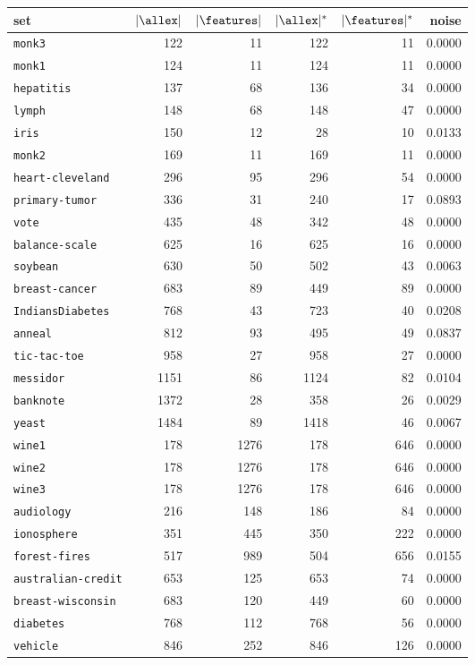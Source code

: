 \begin{tabular}{lrrrrr}
\toprule
set & $|\allex|$ & $|\features|$ & $|\allex|^*$ & $|\features|^*$ & noise \\
\midrule
\texttt{monk3}& 122& 11& 122& 11& 0.0000\\
\texttt{monk1}& 124& 11& 124& 11& 0.0000\\
\texttt{hepatitis}& 137& 68& 136& 34& 0.0000\\
\texttt{lymph}& 148& 68& 148& 47& 0.0000\\
\texttt{iris}& 150& 12& 28& 10& 0.0133\\
\texttt{monk2}& 169& 11& 169& 11& 0.0000\\
\texttt{heart-cleveland}& 296& 95& 296& 54& 0.0000\\
\texttt{primary-tumor}& 336& 31& 240& 17& 0.0893\\
\texttt{vote}& 435& 48& 342& 48& 0.0000\\
\texttt{balance-scale}& 625& 16& 625& 16& 0.0000\\
\texttt{soybean}& 630& 50& 502& 43& 0.0063\\
\texttt{breast-cancer}& 683& 89& 449& 89& 0.0000\\
\texttt{IndiansDiabetes}& 768& 43& 723& 40& 0.0208\\
\texttt{anneal}& 812& 93& 495& 49& 0.0837\\
\texttt{tic-tac-toe}& 958& 27& 958& 27& 0.0000\\
\texttt{messidor}& 1151& 86& 1124& 82& 0.0104\\
\texttt{banknote}& 1372& 28& 358& 26& 0.0029\\
\texttt{yeast}& 1484& 89& 1418& 46& 0.0067\\
\texttt{wine1}& 178& 1276& 178& 646& 0.0000\\
\texttt{wine2}& 178& 1276& 178& 646& 0.0000\\
\texttt{wine3}& 178& 1276& 178& 646& 0.0000\\
\texttt{audiology}& 216& 148& 186& 84& 0.0000\\
\texttt{ionosphere}& 351& 445& 350& 222& 0.0000\\
\texttt{forest-fires}& 517& 989& 504& 656& 0.0155\\
\texttt{australian-credit}& 653& 125& 653& 74& 0.0000\\
\texttt{breast-wisconsin}& 683& 120& 449& 60& 0.0000\\
\texttt{diabetes}& 768& 112& 768& 56& 0.0000\\
\texttt{vehicle}& 846& 252& 846& 126& 0.0000\\

\end{tabular}
